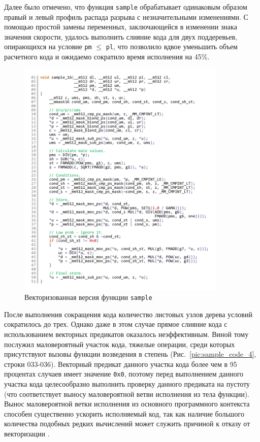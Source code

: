 \documentclass[utf8]{psta}
\begin{document}
Далее было отмечено, что функция \texttt{sample} обрабатывает одинаковым образом правый и левый профиль распада разрыва с незначительными изменениями.
С помощью простой замены переменных, заключающейся в изменении знака значения скорости, удалось выполнить слияние кода для двух поддеревьев, опирающихся на условие \texttt{pm} $\le$ \texttt{pl}, что позволило вдвое уменьшить объем расчетного кода и ожидаемо сократило время исполнения на 45\%. 

\begin{figure}
\includegraphics[width=10cm]{pics/pic_sample_16_code}
\caption{Векторизованная версия функции \texttt{sample}}
\label{pic:sample_16_code}
\end{figure}

После выполнения сокращения кода количество листовых узлов дерева условий сократилось до трех.
Однако даже в этом случае прямое слияние кода с использованием векторных предикатов оказалось неэффективным.
Виной тому послужил маловероятный участок кода, тяжелые операции, среди которых присутствуют вызовы функции возведения в степень (Рис.~\ref{pic:sample_code_4}, строки 033-036).
Векторный предикат данного участка кода более чем в 95 процентах случаев имеет значение \texttt{0x0}, поэтому перед выполнением данного участка кода целесообразно выполнить проверку данного предиката на пустоту (что соответствует выносу маловероятной ветви исполнения из тела функции).
Вынос маловероятной ветки исполнения из основного программного контекста способен существенно ускорить исполняемый код, так как наличие большого количества подобных редких вычислений может служить причиной к отказу от векторизации \cite{RybLowProb}.
\end{document}
